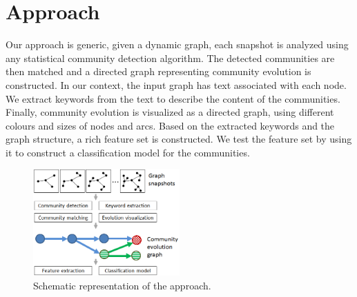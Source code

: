 \documentclass{article} %
\begin{document}
\section{Approach}
Our approach is generic,  given a dynamic graph, each snapshot is analyzed using any statistical community detection algorithm. The detected communities are then matched and a directed graph representing community evolution is constructed. In our context, the input graph has text associated with each node. We extract keywords from the text 
 to describe the content of the communities. Finally, community evolution is visualized as a directed graph, using different colours and sizes of nodes and arcs.  Based on the extracted keywords and the graph structure, a rich feature set is constructed. We test the feature set by using it to construct a classification model for the communities.  

\begin{figure}\label{architecture}
   	\begin{center}
   	\includegraphics[width=0.5\textwidth]{architecture.png}
   	\end{center}
   	\caption{Schematic representation of the approach.}
\end{figure}
\end{document}
